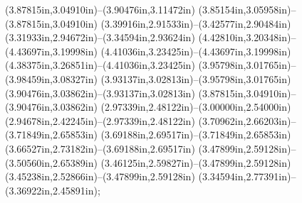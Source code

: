 (3.87815in,3.04910in)--(3.90476in,3.11472in) (3.85154in,3.05958in)--(3.87815in,3.04910in) (3.39916in,2.91533in)--(3.42577in,2.90484in) (3.31933in,2.94672in)--(3.34594in,2.93624in) (4.42810in,3.20348in)--(4.43697in,3.19998in) (4.41036in,3.23425in)--(4.43697in,3.19998in) (4.38375in,3.26851in)--(4.41036in,3.23425in) (3.95798in,3.01765in)--(3.98459in,3.08327in) (3.93137in,3.02813in)--(3.95798in,3.01765in) (3.90476in,3.03862in)--(3.93137in,3.02813in) (3.87815in,3.04910in)--(3.90476in,3.03862in) (2.97339in,2.48122in)--(3.00000in,2.54000in) (2.94678in,2.42245in)--(2.97339in,2.48122in) (3.70962in,2.66203in)--(3.71849in,2.65853in) (3.69188in,2.69517in)--(3.71849in,2.65853in) (3.66527in,2.73182in)--(3.69188in,2.69517in) (3.47899in,2.59128in)--(3.50560in,2.65389in) (3.46125in,2.59827in)--(3.47899in,2.59128in) (3.45238in,2.52866in)--(3.47899in,2.59128in) (3.34594in,2.77391in)--(3.36922in,2.45891in);
